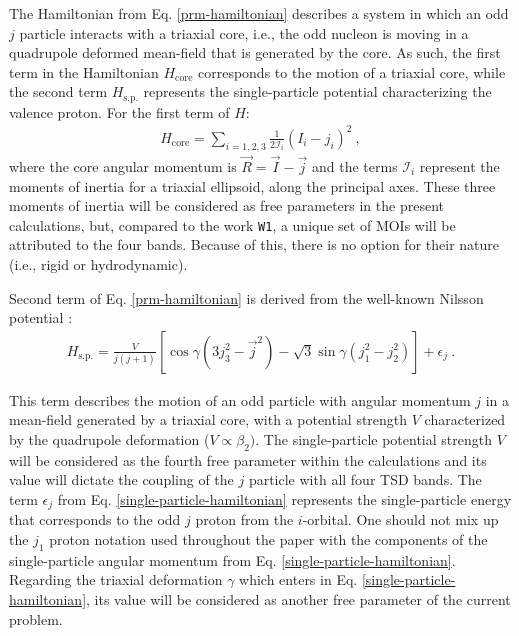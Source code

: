 \documentclass[myclassdoc,debug]{rjparticle}
\begin{document}
The Hamiltonian from Eq. \ref{prm-hamiltonian} describes a system in which an odd $j$ particle interacts with a triaxial core, i.e., the odd nucleon is moving in a quadrupole deformed mean-field that is generated by the core. As such, the first term in the Hamiltonian $H_\text{core}$ corresponds to the motion of a triaxial core, while the second term $H_\text{s.p.}$ represents the single-particle potential characterizing the valence proton. For the first term of $H$:
\begin{align}
    H_\text{core}=\sum_{i=1,2,3}\frac{1}{2\mathcal{I}_i}(I_i-j_i)^2\ ,
    \label{core-hamiltonian}
\end{align}
where the core angular momentum is $\vec{R}=\vec{I}-\vec{j}$ and the terms $\mathcal{I}_i$ represent the moments of inertia for a triaxial ellipsoid, along the principal axes. These three moments of inertia will be considered as free parameters in the present calculations, but, compared to the work \texttt{W1}, a unique set of MOIs will be attributed to the four bands. Because of this, there is no option for their nature (i.e., rigid or hydrodynamic).

Second term of Eq. \ref{prm-hamiltonian} is derived from the well-known Nilsson potential \cite{meyer1975collective,wang2008description}:
\begin{align}
    H_\text{s.p.}=\frac{V}{j(j+1)}\left[\cos\gamma(3j_3^2-\vec{j}^2)-\sqrt{3}\sin\gamma(j_1^2-j_2^2)\right]+\epsilon_j\ .
    \label{single-particle-hamiltonian}
\end{align}

This term describes the motion of an odd particle with angular momentum $j$ in a mean-field generated by a triaxial core, with a potential strength $V$ characterized by the quadrupole deformation ($V\propto\beta_2)$. The single-particle potential strength $V$ will be considered as the fourth free parameter within the calculations and its value will dictate the coupling of the $j$ particle with all four TSD bands. The term $\epsilon_j$ from Eq. \ref{single-particle-hamiltonian} represents the single-particle energy that corresponds to the odd $j$ proton from the $i$-orbital. One should not mix up the $j_1$ proton notation used throughout the paper with the components of the single-particle angular momentum from  Eq. \ref{single-particle-hamiltonian}. Regarding the triaxial deformation $\gamma$ which enters in Eq. \ref{single-particle-hamiltonian}, its value will be considered as another free parameter of the current problem.
\end{document}
